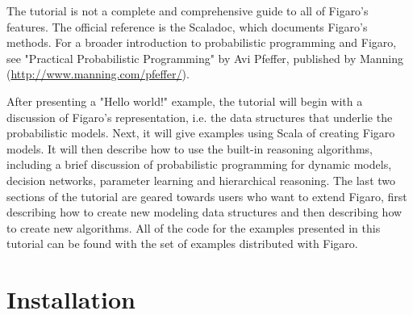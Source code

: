 The tutorial is not a complete and comprehensive guide to all of Figaro's features. The official reference is the Scaladoc, which documents Figaro's methods. For a broader introduction to probabilistic programming and Figaro, see "Practical Probabilistic Programming" by Avi Pfeffer, published by Manning (\url{http://www.manning.com/pfeffer/}).

After presenting a "Hello world!" example, the tutorial will begin with a discussion of Figaro's representation, i.e. the data structures that underlie the probabilistic models. Next, it will give examples
using Scala of creating Figaro models. It will then describe how to use the built-in reasoning algorithms, including a brief discussion of probabilistic programming for dynamic models, decision networks,
parameter learning and hierarchical reasoning. The last two sections of the tutorial are geared towards users who want to extend Figaro, first describing how to create new modeling data structures and then describing how to create new algorithms. All of the code for the examples presented in this tutorial can be found with the set of examples distributed with Figaro.

\section{Installation}


